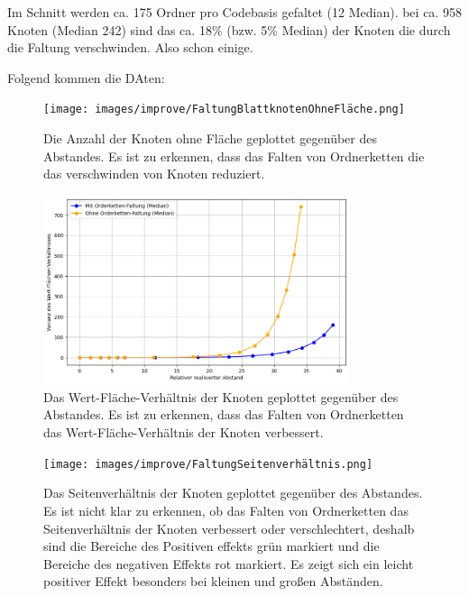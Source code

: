 Im Schnitt werden ca. 175 Ordner pro Codebasis gefaltet (12 Median). bei ca. 958 Knoten (Median 242) sind das ca. 18\% (bzw. 5\% Median) der Knoten die durch die Faltung verschwinden. Also schon einige. 

Folgend kommen die DAten:

\begin{figure}
    \centering
    \texttt{[image: images/improve/FaltungBlattknotenOhneFläche.png]}
    \caption{Die Anzahl der Knoten ohne Fläche geplottet gegenüber des Abstandes. Es ist zu erkennen, dass das Falten von Ordnerketten die das verschwinden von Knoten reduziert.}
    \label{fig:FaltungKnotenOhneFläche}
\end{figure}

\begin{figure}
    \centering
    \includegraphics[width=0.8\textwidth]{images/improve/FaltungWertFlächeVerhältnis.png}
    \caption{Das Wert-Fläche-Verhältnis der Knoten geplottet gegenüber des Abstandes. Es ist zu erkennen, dass das Falten von Ordnerketten das Wert-Fläche-Verhältnis der Knoten verbessert.}
    \label{fig:FaltungWertFlächeVerhältnis}
\end{figure}

\begin{figure}
    \centering
    \texttt{[image: images/improve/FaltungSeitenverhältnis.png]}
    \caption{Das Seitenverhältnis der Knoten geplottet gegenüber des Abstandes. Es ist nicht klar zu erkennen, ob das Falten von Ordnerketten das Seitenverhältnis der Knoten verbessert oder verschlechtert, deshalb sind die Bereiche des Positiven effekts grün markiert und die Bereiche des negativen Effekts rot markiert. Es zeigt sich ein leicht positiver Effekt besonders bei kleinen und großen Abständen.} 
    \label{fig:FaltungSeitenverhältnis}
\end{figure}

